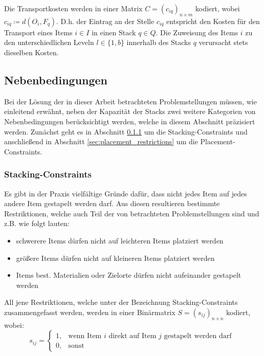 \vfill
\pagebreak

Die Transportkosten werden in einer Matrix $C = (c_{iq})_{n \times m}$ kodiert,
wobei $c_{iq} \coloneqq d(O_i, F_q)$. D.h. der Eintrag an der Stelle $c_{iq}$ entspricht
den Kosten für den Transport eines Items $i \in I$ in einen Stack $q \in Q$.
Die Zuweisung des Items $i$ zu den unterschiedlichen Leveln $l \in \{1, b\}$ innerhalb des Stacks $q$
verursacht stets dieselben Kosten.

\pagebreak

\subsection{Nebenbedingungen}
\label{sec:constraints}

Bei der Lösung der in dieser Arbeit betrachteten Problemstellungen müssen, wie einleitend erwähnt,
neben der Kapazität der Stacks zwei weitere Kategorien von Nebenbedingungen berücksichtigt werden, welche in diesem Abschnitt
präzisiert werden. Zunächst geht es in Abschnitt \ref{sec:stacking_restrictions} um die Stacking-Constraints
und anschließend in Abschnitt \ref{sec:placement_restrictions} um die Placement-Constraints.

\subsubsection{Stacking-Constraints}
\label{sec:stacking_restrictions}

Es gibt in der Praxis vielfältige Gründe dafür, dass nicht jedes Item auf jedes andere Item gestapelt werden darf.
Aus diesen resultieren bestimmte Restriktionen, welche auch Teil der von \citet{Bruns2015} betrachteten Problemstellungen
sind und z.B. wie folgt lauten:
\begin{itemize}
  \item schwerere Items dürfen nicht auf leichteren Items platziert werden
  \item größere Items dürfen nicht auf kleineren Items platziert werden
  \item Items best. Materialien oder Zielorte dürfen nicht aufeinander gestapelt werden
\end{itemize}

All jene Restriktionen, welche unter der Bezeichnung Stacking-Constraints zusammengefasst werden,
werden in einer Binärmatrix $S = (s_{ij})_{n \times n}$ kodiert, wobei:
\[
    s_{ij} =
\begin{cases}
    1, & \text{wenn Item $i$ direkt auf Item $j$ gestapelt werden darf }\\
    0, & \text{sonst}
\end{cases}
\]

